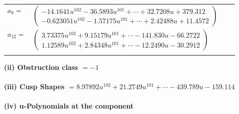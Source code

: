 \documentclass[1p]{elsarticle_modified}
\theoremstyle{definition}
\begin{document}
\begin{tabular}{m{7pt} m{180pt} m{7pt} m{180pt} }
\flushright $a_{8}=$&$\begin{pmatrix}-14.1641 u^{102}-36.5893 u^{101}+\cdots+32.7208 u+379.312\\-0.623051 u^{102}-1.57175 u^{101}+\cdots+2.42488 u+11.4572\end{pmatrix}$ \\
\flushright $a_{12}=$&$\begin{pmatrix}3.73375 u^{102}+9.15179 u^{101}+\cdots-141.830 u-66.2722\\1.12589 u^{102}+2.84348 u^{101}+\cdots-12.2490 u-30.2912\end{pmatrix}$\\&\end{tabular}
\flushleft \textbf{(ii) Obstruction class $= -1$}\\~\\
\flushleft \textbf{(iii) Cusp Shapes $= 8.97892 u^{102}+21.2749 u^{101}+\cdots-439.789 u-159.114$}\\~\\
\newpage\renewcommand{\arraystretch}{1}
\flushleft \textbf{(iv) u-Polynomials at the component}\newline \\
\end{document}
